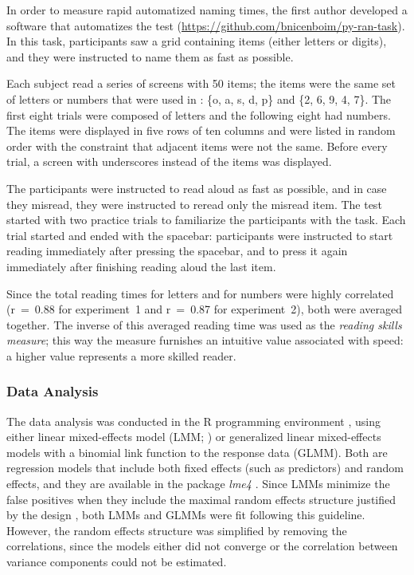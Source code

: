 \documentclass{frontiersSCNS}\usepackage{knitr}
\begin{document}
In order to measure rapid automatized naming times, the first author developed a software that automatizes the test (\url{https://github.com/bnicenboim/py-ran-task}). In this task, participants saw a grid containing items (either letters or digits), and they were instructed to name them as fast as possible. 


Each subject read a series of screens with 50 items;  the items were the same set of letters or numbers that were used in \citet{DenklaRudel1976}: \{o, a, s, d, p\} and \{2, 6, 9, 4, 7\}. The first eight trials were composed of letters and the following eight had numbers. The items were displayed in five rows of ten columns and were listed in random order with the constraint that adjacent items were not the same. Before every trial, a screen with underscores instead of the items was displayed.

The participants were instructed to read aloud as fast as possible, and in case they misread, they were instructed to reread only the misread item. The test started with two practice trials to familiarize the participants with the task. Each trial started and ended with the spacebar: participants were instructed to start reading immediately after pressing the spacebar, and to press it again immediately after finishing reading aloud the last item.  


Since the total reading times  for letters and for numbers were highly correlated (r~=~0.88 for experiment~1 and r~=~0.87 for  experiment~2), both were averaged together. The inverse of this averaged reading time was used as the \textit{reading skills measure}; this way the measure furnishes an intuitive value associated with speed: a higher value represents a more skilled reader.



\subsubsection{Data Analysis}
The data analysis was conducted in the R programming environment \citep{R2013}, using either linear mixed-effects model (LMM; \citealp{PinheiroBates2000}) or generalized linear  mixed-effects models with a binomial link function to the response data (GLMM). Both are regression models that include both fixed effects (such as predictors) and random effects, and they are available in  the package \textit{lme4} \citep{lme4}. Since LMMs minimize the false positives when they include the maximal random effects structure justified by the design \citep{SchielzethForstmeier2009,BarrEtAl2013}, both LMMs and GLMMs were fit following this guideline. However, the random effects structure was simplified by removing the correlations, since the models either did not converge or the correlation between variance components could not be estimated. 
\end{document}
